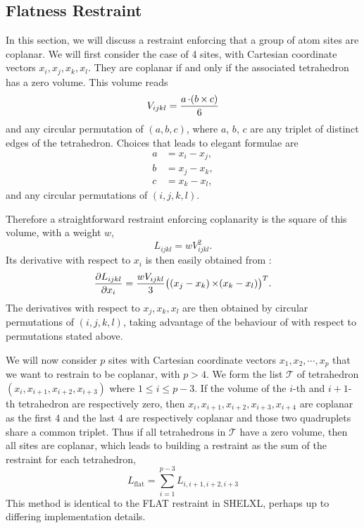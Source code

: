 \documentclass[pdf]{iucr}
\begin{document}
\subsection{Flatness Restraint}

In this section, we will discuss a restraint enforcing that a group of atom sites are coplanar. We will first consider the case of 4 sites, with Cartesian coordinate vectors $x_i, x_j, x_k, x_l$. They are coplanar if and only if the associated tetrahedron has a zero volume. This volume reads
\begin{equation}
V_{ijkl} = \frac{a \operatorname{\cdot} (b \operatorname{\times} c)}{6}
\label{eqn:tetrahedron:volume}
\end{equation}
and any circular permutation of $(a, b, c)$, where $a$, $b$, $c$ are any triplet of distinct edges of the tetrahedron. Choices that leads to elegant formulae are
\begin{align}
a &= x_i - x_j,\nonumber\\ 
b &= x_j - x_k,\label{eqn:tetrahedron:edges:choice1}\\ 
c &= x_k - x_l,\nonumber
\end{align}
and any circular permutations of $(i,j,k,l)$. 

Therefore a straightforward restraint enforcing coplanarity is the square of this volume, with a weight $w$,
\begin{equation}
L_{ijkl} = w V_{ijkl}^2.
\end{equation}
Its derivative with respect to $x_i$ is then easily obtained from :
\begin{equation}
\frac{\partial L_{ijkl}}{\partial x_i} = \frac{wV_{ijkl}}{3}\big((x_j - x_k) \operatorname{\times} (x_k - x_l)\big)^T.
\end{equation}
The derivatives with respect to $x_j, x_k, x_l$ are then obtained by circular permutations of $(i,j,k,l)$, taking advantage of the behaviour of  with respect to permutations stated above.

We will now consider $p$ sites with Cartesian coordinate vectors $x_1, x_2, \cdots, x_p$ that we want to restrain to be coplanar, with $p>4$. We form the list $\mathcal{T}$ of tetrahedron $(x_i, x_{i+1}, x_{i+2}, x_{i+3})$ where $1 \le i \le p-3$. If the volume of the $i$-th and $i+1$-th tetrahedron are respectively zero, then $x_i, x_{i+1}, x_{i+2}, x_{i+3}, x_{i+4}$ are coplanar as the first 4 and the last 4 are respectively coplanar and those two quadruplets share a common triplet. Thus if all tetrahedrons in $\mathcal{T}$ have a zero volume, then all sites are coplanar, which leads to building a restraint as the sum of the restraint for each tetrahedron,
\begin{equation}
L_\text{flat} = \sum_{i=1}^{p-3} L_{i,i+1,i+2,i+3}
\label{eqn:restraint:flatness:many}
\end{equation}
This method is identical to the FLAT restraint in SHELXL, perhaps up to differing implementation details. 
\end{document}

